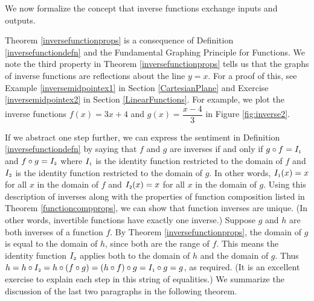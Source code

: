 \smallskip

We now formalize the concept that inverse functions exchange inputs and outputs.
\smallskip


\smallskip

Theorem \ref{inversefunctionprops} is a consequence of Definition \ref{inversefunctiondefn} and the Fundamental Graphing Principle for Functions.  We note the third property in Theorem \ref{inversefunctionprops} tells us that the graphs of inverse functions are reflections about the line $y=x$.  For a proof of this, see Example \ref{inversemidpointex1} in Section \ref{CartesianPlane} and Exercise \ref{inversemidpointex2} in Section \ref{LinearFunctions}.  For example, we plot the inverse functions $f(x) = 3x+4$ and $g(x) = \dfrac{x-4}{3}$ in Figure \ref{fig:inverse2}.



If we abstract one step further, we can express the sentiment in Definition \ref{inversefunctiondefn} by saying that $f$ and $g$ are inverses if and only if  $g \circ f = I_{\mbox{\tiny $1$}}$ and $f \circ g = I_{\mbox{\tiny $2$}}$ where $I_{\mbox{\tiny $1$}}$ is the identity function restricted to the domain of $f$ and $I_{\mbox{\tiny $2$}}$ is the identity function restricted to the domain of $g$.  In other words, $I_{\mbox{\tiny $1$}}(x) = x$ for all $x$ in the domain of $f$ and $I_{\mbox{\tiny $2$}}(x) = x$ for all $x$ in the domain of $g$.   Using this description of inverses along with the properties of function composition listed in Theorem  \ref{functioncompprops}, we can show that function inverses are unique. (In other words, invertible functions have exactly one inverse.)  Suppose $g$ and $h$ are both inverses of a function $f$. By Theorem \ref{inversefunctionprops}, the domain of $g$ is equal to the domain of $h$, since both are the range of $f$.  This means the identity function $I_{\mbox{\tiny $2$}}$ applies both to the domain of $h$ and the domain of $g$.  Thus $h = h \circ I_{\mbox{\tiny $2$}} = h \circ (f \circ g) = (h \circ f) \circ g = I_{\mbox{\tiny $1$}} \circ g = g$, as required. (It is an excellent exercise to explain each step in this string of equalities.)  We summarize the discussion of the last two paragraphs in the following theorem.

